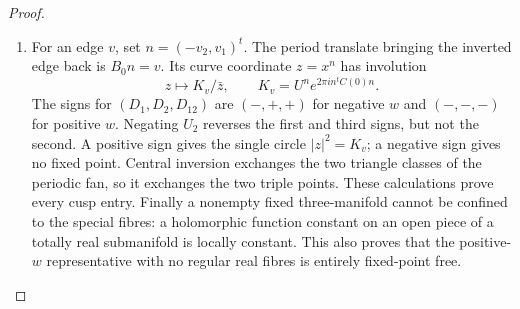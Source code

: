 \begin{proof}
\begin{enumerate}[label=\arabic*.,leftmargin=*]
\item For an edge $v$, set $n=(-v_2,v_1)^t$. The period translate bringing
the inverted edge back is $B_0n=v$. Its curve coordinate $z=x^n$ has
involution
\[
 z\longmapsto K_v/\bar z,
 \qquad K_v=U^n e^{2\pi i n^tC(0)n}.
 \label{mapsI:real-eq-8}
\]
The signs for $(D_1,D_2,D_{12})$ are $(-,+,+)$ for negative $w$
and $(-,-,-)$ for positive $w$. Negating $U_2$ reverses the first and
third signs, but not the second. A positive sign gives the single
circle $|z|^2=K_v$; a negative sign gives no fixed point. Central
inversion exchanges the two triangle classes of the periodic fan, so
it exchanges the two triple points. These calculations prove every
cusp entry. Finally a nonempty fixed three-manifold cannot be confined
to the special fibres: a holomorphic function constant on an open
piece of a totally real submanifold is locally constant. This also
proves that the positive-$w$ representative with no regular real
fibres is entirely fixed-point free.
\end{enumerate}
\end{proof}

